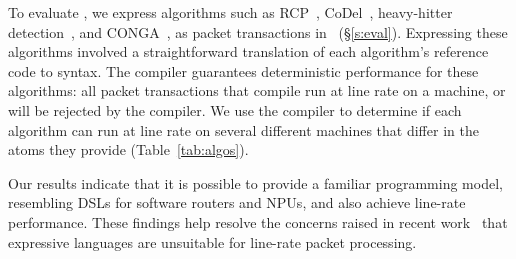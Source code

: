 To evaluate \pktlanguage, we express algorithms such as RCP~\cite{rcp},
CoDel~\cite{codel}, heavy-hitter detection~\cite{opensketch}, and
CONGA~\cite{conga}, as packet transactions in \pktlanguage~(\S\ref{s:eval}).
Expressing these algorithms involved a straightforward translation of each
algorithm's reference code to \pktlanguage syntax.  The \pktlanguage compiler
guarantees deterministic performance for these algorithms: all packet
transactions that compile run at line rate on a \absmachine machine, or will be
rejected by the compiler.  We use the \pktlanguage compiler to determine if
each algorithm can run at line rate on several different \absmachine machines
that differ in the atoms they provide (Table~\ref{tab:algos}).

Our results indicate that it is possible to provide a familiar programming
model, resembling DSLs for software routers and NPUs, and also achieve
line-rate performance. These findings help resolve the concerns raised in
recent work~\cite{p4} that expressive languages are unsuitable for line-rate
packet processing.
